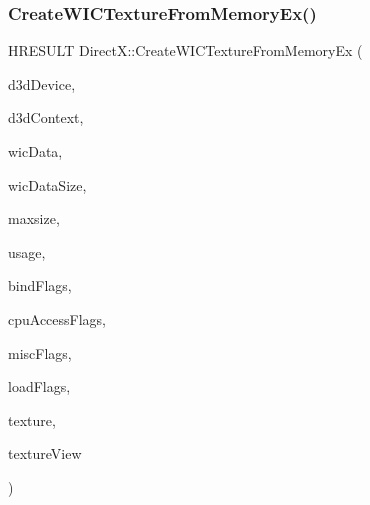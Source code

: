 \subsubsection{\texorpdfstring{Create\+W\+I\+C\+Texture\+From\+Memory\+Ex()}{CreateWICTextureFromMemoryEx()}\hspace{0.1cm}{\footnotesize\ttfamily [2/2]}}
{\footnotesize\ttfamily H\+R\+E\+S\+U\+LT Direct\+X\+::\+Create\+W\+I\+C\+Texture\+From\+Memory\+Ex (\begin{DoxyParamCaption}\item[{\+\_\+\+In\+\_\+ I\+D3\+D11\+Device $\ast$}]{d3d\+Device,  }\item[{\+\_\+\+In\+\_\+opt\+\_\+ I\+D3\+D11\+Device\+Context $\ast$}]{d3d\+Context,  }\item[{\+\_\+\+In\+\_\+reads\+\_\+bytes\+\_\+(wic\+Data\+Size) const uint8\+\_\+t $\ast$}]{wic\+Data,  }\item[{\+\_\+\+In\+\_\+ size\+\_\+t}]{wic\+Data\+Size,  }\item[{\+\_\+\+In\+\_\+ size\+\_\+t}]{maxsize,  }\item[{\+\_\+\+In\+\_\+ D3\+D11\+\_\+\+U\+S\+A\+GE}]{usage,  }\item[{\+\_\+\+In\+\_\+ unsigned int}]{bind\+Flags,  }\item[{\+\_\+\+In\+\_\+ unsigned int}]{cpu\+Access\+Flags,  }\item[{\+\_\+\+In\+\_\+ unsigned int}]{misc\+Flags,  }\item[{\+\_\+\+In\+\_\+ unsigned int}]{load\+Flags,  }\item[{\+\_\+\+Outptr\+\_\+opt\+\_\+ I\+D3\+D11\+Resource $\ast$$\ast$}]{texture,  }\item[{\+\_\+\+Outptr\+\_\+opt\+\_\+ I\+D3\+D11\+Shader\+Resource\+View $\ast$$\ast$}]{texture\+View }\end{DoxyParamCaption})}

